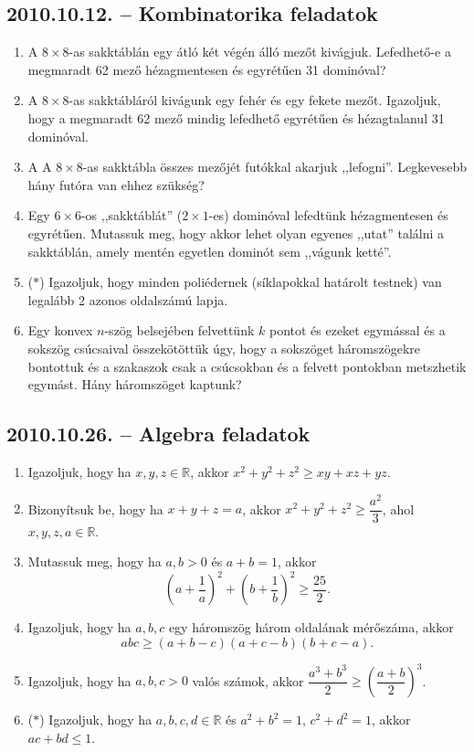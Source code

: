 \subsection*{2010.10.12. -- Kombinatorika feladatok}
\begin{enumerate}
\item A $8\times 8$-as sakktáblán egy átló két végén álló mezőt kivágjuk. Lefedhető-e a megmaradt 62 mező hézagmentesen és egyrétűen 31 dominóval?
\item A $8\times 8$-as sakktábláról kivágunk egy fehér és egy fekete mezőt. Igazoljuk, hogy a megmaradt 62 mező mindig lefedhető egyrétűen és hézagtalanul 31 dominóval.
\item A A $8\times 8$-as sakktábla összes mezőjét futókkal akarjuk ,,lefogni''.
Legkevesebb hány futóra van ehhez szükség?
\item Egy $6\times 6$-os ,,sakktáblát'' ($2\times 1$-es) dominóval lefedtünk hézagmentesen és egyrétűen. Mutassuk meg, hogy akkor lehet olyan egyenes ,,utat''
találni a sakktáblán, amely mentén egyetlen dominót sem ,,vágunk ketté''.
\item ($*$) Igazoljuk, hogy minden poliédernek (síklapokkal határolt testnek) van legalább 2 azonos oldalszámú lapja.
\item Egy konvex $n$-szög belsejében felvettünk $k$ pontot és ezeket egymással és a sokszög csúcsaival összekötöttük úgy, hogy a sokszöget háromszögekre bontottuk és a szakaszok csak a csúcsokban és a felvett pontokban metszhetik egymást. Hány háromszöget kaptunk?
\end{enumerate}

\subsection*{2010.10.26. -- Algebra feladatok}
\begin{enumerate}
\item Igazoljuk, hogy ha $x,y,z\in\mathbb{R}$, akkor
$x^2+y^2+z^2\ge xy+xz+yz$.
\item Bizonyítsuk be, hogy ha $x+y+z=a$, akkor $x^2+y^2+z^2\ge \dfrac{a^2}{3}$,
ahol $x,y,z,a\in\mathbb{R}$.
\item Mutassuk meg, hogy ha $a,b>0$ és $a+b=1$, akkor
$$\left(a+\dfrac{1}{a}\right)^2+\left(b+\dfrac{1}{b}\right)^2\ge \dfrac{25}{2}.$$
\item Igazoljuk, hogy ha $a,b,c$ egy háromszög három oldalának mérőszáma, akkor 
$$abc\ge (a+b-c)(a+c-b)(b+c-a).$$
\item Igazoljuk, hogy ha $a,b,c>0$ valós számok, akkor $\dfrac{a^3+b^3}{2}\ge 
\left(\dfrac{a+b}{2}\right)^3$.
\item ($*$) Igazoljuk, hogy ha $a,b,c,d\in\mathbb{R}$ és 
$a^2+b^2=1$, $c^2+d^2=1$, akkor $ac+bd\le 1$.
\end{enumerate}

